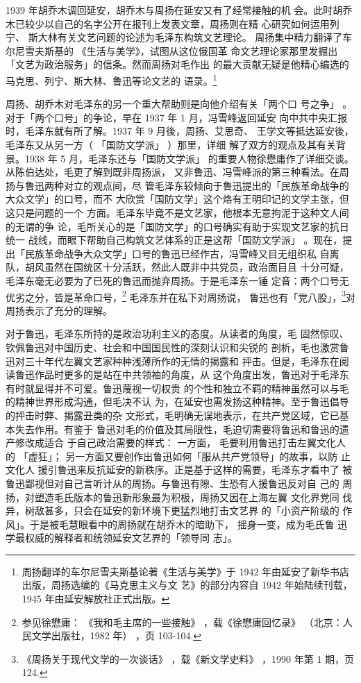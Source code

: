 1939 年胡乔木调回延安，胡乔木与周扬在延安又有了经常接触的机
会。此时胡乔木已较少以自己的名字公开在报刊上发表文章，周扬则在精
心研究如何运用列宁、
斯大林有关文艺问题的论述为毛泽东构筑文艺理论。
周扬集中精力翻译了车尔尼雪夫斯基的
《生活与美学》，试图从这位俄国革
命文艺理论家那里发掘出「文艺为政治服务」的信条。然而周扬对毛作出
的最大贡献无疑是他精心编选的马克思、列宁、斯大林、鲁迅等论文艺的
语录。\footnote{周扬翻译的车尔尼雪夫斯基论著《生活与美学》于 1942 年由延安了新华书店出版，周扬选编的《马克思主义与文
艺》的部分内容自 1942 年始陆续刊载，1945 年由延安解放社正式出版。} 

周扬、胡乔木对毛泽东的另一个重大帮助则是向他介绍有关「两个口
号之争」
。对于「两个口号」的争论，早在 1937 年 1 月，冯雪峰返回延安
向中共中央汇报时，毛泽东就有所了解。1937 年 9 月後，周扬、艾思奇、
王学文等抵达延安後，毛泽东又从另一方（
「国防文学派」
）那里，详细
解了双方的观点及其有关背景。1938 年 5 月，毛泽东还与「国防文学派」
的重要人物徐懋庸作了详细交谈。从陈伯达处，毛更了解到既非周扬派，
又非鲁迅、冯雪峰派的第三种看法。在周扬与鲁迅两种对立的观点间，尽
管毛泽东较倾向于鲁迅提出的「民族革命战争的大众文学」的口号，而不
大欣赏「国防文学」这个烙有王明印记的文学主张，但这只是问题的一个
方面。毛泽东毕竟不是文艺家，他根本无意拘泥于这种文人间的无谓的争
论，毛所关心的是「国防文学」的口号确实有助于实现文艺家的抗日统一
战线，而眼下帮助自己构筑文艺体系的正是这帮「国防文学派」
。现在，提
出「民族革命战争大众文学」口号的鲁迅已经作古，冯雪峰又目无组织私
自离队，胡风虽然在国统区十分活跃，然此人既非中共党员，政治面目且
十分可疑，毛泽东毫无必要为了已死的鲁迅而抛弃周扬。于是毛泽东一锤
定音：两个口号无优劣之分，皆是革命口号，\footnote{参见徐懋庸：
《我和毛主席的一些接触》
，载《徐懋庸回忆录》
（北京：人民文学出版社，1982 年）
，页 103-104.} 毛泽东并在私下对周扬说，
鲁迅也有「党八股」，\footnote{《周扬关于现代文学的一次谈话》
，载《新文学史料》
，1990 年第 1 期，页 124.}对周扬表示了充分的理解。

对于鲁迅，毛泽东所持的是政治功利主义的态度。从读者的角度，毛 固然惊叹、
钦佩鲁迅对中国历史、社会和中国国民性的深刻认识和尖锐的 剖析，毛也激赏鲁
迅对三十年代左翼文艺家种种浅薄所作的无情的揭露和 抨击。但是，毛泽东在阅
读鲁迅作品时更多的是站在中共领袖的角度，从 这个角度出发，鲁迅对于毛泽东
有时就显得并不可爱。鲁迅蔑视一切权贵 的个性和独立不羁的精神虽然可以与毛
的精神世界形成沟通，但毛决不认 为，在延安也需发扬这种精神。至于鲁迅倡导
的抨击时弊、揭露丑类的杂 文形式，毛明确无误地表示，在共产党区域，它已基
本失去作用。有鉴于 鲁迅对毛的价值及其局限性，毛迫切需要将鲁迅和鲁迅的遗
产修改成适合 于自己政治需要的样式： 一方面， 毛要利用鲁迅打击左翼文化人
的 「虚狂」； 另一方面又要创作出鲁迅如何「服从共产党领导」的故事，以防
止文化人 援引鲁迅来反抗延安的新秩序。正是基于这样的需要，毛泽东才看中了
被 鲁迅鄙视但对自己言听计从的周扬。与鲁迅有隙、生恐有人援鲁迅反对自 己的
周扬，对塑造毛氏版本的鲁迅新形象最为积极，周扬又因在上海左翼 文化界党同
伐异，树敌甚多，只会在延安的新环境下更猛烈地打击文艺界 的「小资产阶级的
作风」。于是被毛慧眼看中的周扬就在胡乔木的暗助下， 摇身一变，成为毛氏鲁
迅学最权威的解释者和统领延安文艺界的「领导同 志」。

